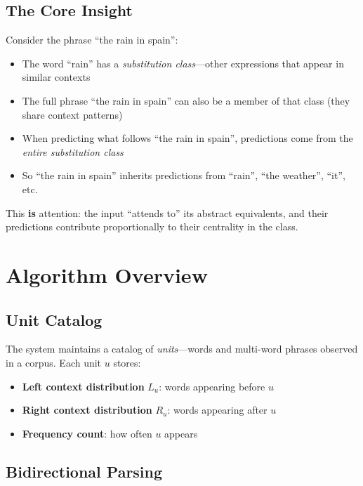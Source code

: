 \documentclass[11pt,a4paper]{article}
\begin{document}
\subsection{The Core Insight}

Consider the phrase ``the rain in spain'':

\begin{itemize}
    \item The word ``rain'' has a \emph{substitution class}---other expressions that appear in similar contexts
    \item The full phrase ``the rain in spain'' can also be a member of that class (they share context patterns)
    \item When predicting what follows ``the rain in spain'', predictions come from the \emph{entire substitution class}
    \item So ``the rain in spain'' inherits predictions from ``rain'', ``the weather'', ``it'', etc.
\end{itemize}

This \textbf{is} attention: the input ``attends to'' its abstract equivalents, and their predictions contribute proportionally to their centrality in the class.

\section{Algorithm Overview}

\subsection{Unit Catalog}

The system maintains a catalog of \emph{units}---words and multi-word phrases observed in a corpus. Each unit $u$ stores:

\begin{itemize}
    \item \textbf{Left context distribution} $L_u$: words appearing before $u$
    \item \textbf{Right context distribution} $R_u$: words appearing after $u$
    \item \textbf{Frequency count}: how often $u$ appears
\end{itemize}

\subsection{Bidirectional Parsing}
\end{document}
